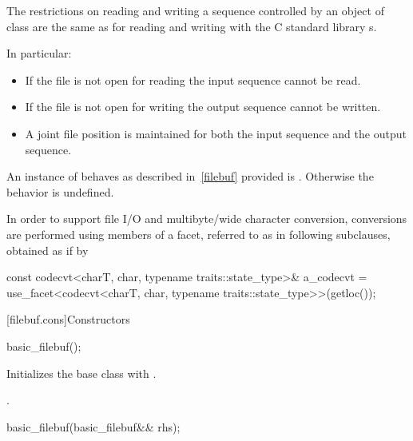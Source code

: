 \pnum
The restrictions on reading and writing a sequence controlled by an
object of class
are the same as for reading and writing with the C standard library
s.

\pnum
In particular:
\begin{itemize}
\item
If the file is not open for reading the input sequence
cannot be read.
\item
If the file is not open for writing the output
sequence cannot be written.
\item
A joint file position is maintained for both the input sequence and
the output sequence.
\end{itemize}

\pnum
An instance of
behaves as described in~\ref{filebuf} provided
is
.
Otherwise the behavior is undefined.

\pnum
In order to support file I/O and multibyte/wide character conversion,
conversions are performed using members of a facet, referred to as
 in following subclauses, obtained as if by
\begin{codeblock}
const codecvt<charT, char, typename traits::state_type>& a_codecvt =
  use_facet<codecvt<charT, char, typename traits::state_type>>(getloc());
\end{codeblock}

[filebuf.cons]{Constructors}

%
\begin{itemdecl}
basic_filebuf();
\end{itemdecl}

\begin{itemdescr}
\pnum
\effects
Initializes the base class with
.

\pnum
\ensures
{}.
\end{itemdescr}

%
\begin{itemdecl}
basic_filebuf(basic_filebuf&& rhs);
\end{itemdecl}

